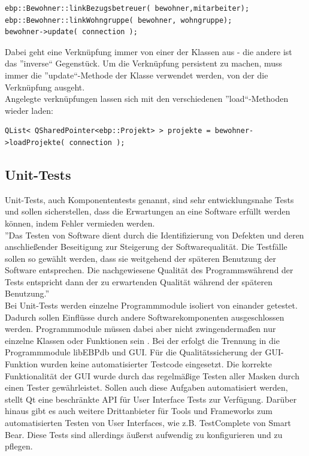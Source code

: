 \begin{lstlisting}
ebp::Bewohner::linkBezugsbetreuer( bewohner,mitarbeiter);
ebp::Bewohner::linkWohngruppe( bewohner, wohngruppe);
bewohner->update( connection );
\end{lstlisting}
Dabei geht eine Verknüpfung immer von einer der Klassen aus - die andere ist das ''inverse`` Gegenstück.
Um die Verknüpfung persistent zu machen, muss immer die ''update``-Methode der Klasse verwendet werden, von der die Verknüpfung ausgeht.\\
Angelegte verknüpfungen lassen sich mit den verschiedenen ''load``-Methoden wieder laden:\\
\begin{lstlisting}
QList< QSharedPointer<ebp::Projekt> > projekte = bewohner->loadProjekte( connection );
\end{lstlisting}

\newpage

\subsection{Unit-Tests}

Unit-Tests, auch Komponententests genannt, sind sehr entwicklungsnahe Tests und sollen sicherstellen, dass die Erwartungen an eine Software erfüllt
werden können, indem Fehler vermieden werden.\\
''Das Testen von Software dient durch die Identifizierung von Defekten und deren anschließender Beseitigung zur Steigerung der Softwarequalität. Die 
Testfälle sollen so gewählt werden, dass sie weitgehend der späteren Benutzung der Software entsprechen. Die nachgewiesene Qualität des
Programmswährend der Tests entspricht dann der zu erwartenden Qualität während der späteren Benutzung\cite[S. 11]{Softwaretests}.''\\

Bei Unit-Tests werden einzelne Programmmodule isoliert von einander getestet. Dadurch sollen Einflüsse durch andere Softwarekomponenten ausgeschlossen
werden. Programmmodule müssen dabei aber nicht zwingendermaßen nur einzelne Klassen oder Funktionen sein \cite[Vgl. S. 11]{Softwaretests}. Bei der
\EBP erfolgt die Trennung in die Programmmodule libEBPdb und GUI. Für die Qualitätssicherung der GUI-Funktion wurden keine automatisierter Testcode
eingesetzt. Die korrekte Funktionalität der GUI wurde durch das regelmäßige Testen aller Masken durch einen Tester gewährleistet. Sollen auch diese
Aufgaben automatisiert werden, stellt Qt eine beschränkte API für User Interface Tests zur Verfügung. Darüber hinaus gibt es auch weitere
Drittanbieter für Tools und Frameworks zum automatisierten Testen von User Interfaces, wie z.B. TestComplete von Smart Bear. Diese Tests sind
allerdings äußerst aufwendig zu konfigurieren und zu pflegen.\\

